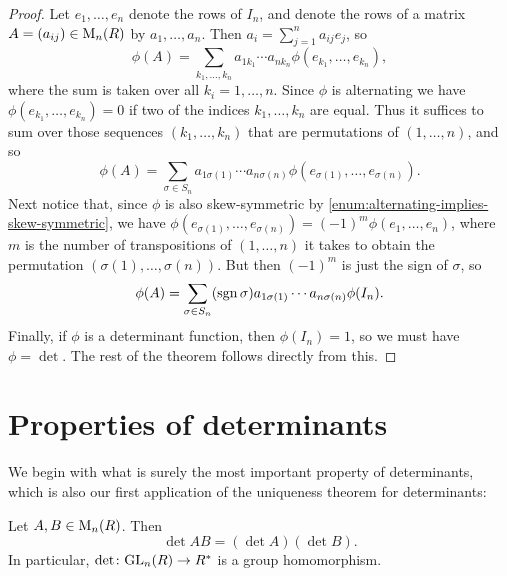 \begin{proof}
    Let $e_1, \ldots, e_n$ denote the rows of $I_n$, and denote the rows of a matrix $A = (a_{ij}) \in \mathrm{M}_{n}(R)$ by $a_1, \ldots, a_n$. Then $a_i = \sum_{j=1}^n a_{ij} e_j$, so
    \begin{equation*}
        \phi(A)
            = \sum_{k_1, \ldots, k_n} a_{1k_1} \cdots a_{nk_n} \phi(e_{k_1}, \ldots, e_{k_n}),
    \end{equation*}
    where the sum is taken over all $k_i = 1, \ldots, n$. Since $\phi$ is alternating we have $\phi(e_{k_1}, \ldots, e_{k_n}) = 0$ if two of the indices $k_1, \ldots, k_n$ are equal. Thus it suffices to sum over those sequences $(k_1, \ldots, k_n)$ that are permutations of $(1, \ldots, n)$, and so
    \begin{equation*}
        \phi(A)
            = \sum_{\sigma \in S_n} a_{1 \sigma(1)} \cdots a_{n \sigma(n)} \phi(e_{\sigma(1)}, \ldots, e_{\sigma(n)}).
    \end{equation*}
    Next notice that, since $\phi$ is also skew-symmetric by \cref{enum:alternating-implies-skew-symmetric}, we have $\phi(e_{\sigma(1)}, \ldots, e_{\sigma(n)}) = (-1)^m \phi(e_1, \ldots, e_n)$, where $m$ is the number of transpositions of $(1, \ldots, n)$ it takes to obtain the permutation $(\sigma(1), \ldots, \sigma(n))$. But then $(-1)^m$ is just the sign of $\sigma$, so
    \begin{equation*}
        \phi(A)
            = \sum_{\sigma \in S_n} (\sign\sigma) a_{1 \sigma(1)} \cdots a_{n \sigma(n)} \phi(I_n).
    \end{equation*}
    Finally, if $\phi$ is a determinant function, then $\phi(I_n) = 1$, so we must have $\phi = \det$. The rest of the theorem follows directly from this.
\end{proof}


\section{Properties of determinants}

We begin with what is surely the most important property of determinants, which is also our first application of the uniqueness theorem for determinants:

\begin{theorem}
    \label{thm:determinant-multiplicative}
    Let $A,B \in \mathrm{M}_{n}(R)$. Then
    \begin{equation*}
        \det AB
            = (\det A) (\det B).
    \end{equation*}
    In particular, $\det \colon \mathrm{GL}_{n}(R) \to R^*$ is a group homomorphism.
\end{theorem}

